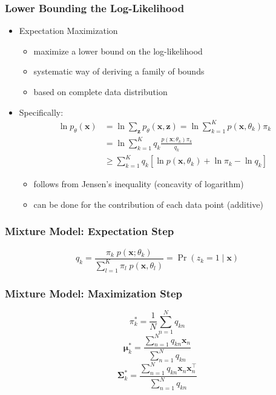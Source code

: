 \documentclass[conference,11pt]{IEEEtran}
\newcommand{\matr}[1]{\boldsymbol{\mathbf{#1}}}
\newcommand{\vect}[1]{\boldsymbol{\mathbf{#1}}}
\newcommand{\trns}[1]{#1^{\top}}
\begin{document}
\subsubsection{Lower Bounding the Log-Likelihood}
\begin{itemize}
  \item Expectation Maximization
    \begin{itemize}
      \item maximize a lower bound on the log-likelihood
      \item systematic way of deriving a family of bounds
      \item based on complete data distribution
    \end{itemize}
  \item Specifically:
    \begin{align*}
      \ln p_{\theta}(\vect{x}) &= \ln \sum_{\vect{z}} p_{\theta}(\vect{x},
      \vect{z}) = \ln \sum_{k=1}^K p(\vect{x}, \theta_k) \pi_k \\
      &= \ln \sum_{k=1}^K q_k \frac{p(\vect{x}; \theta_k) \pi_k}{q_k} \\
      &\geq \sum_{k=1}^K q_k \left[\ln p(\vect{x},\theta_k)+\ln\pi_k-\ln q_k \right]
    \end{align*}
    \begin{itemize}
      \item follows from Jensen's inequality (concavity of logarithm)
      \item can be done for the contribution of each data point (additive)
    \end{itemize}
\end{itemize}

\subsubsection{Mixture Model: Expectation Step}
\[
  q_k = \frac{\pi_k\; p(\vect{x}; \theta_k)}{\sum_{l=1}^K \pi_l\;p(\vect{x}, \theta_l)}
  = \Pr(z_k = 1 \mid \vect{x})
\]

\subsubsection{Mixture Model: Maximization Step}
\[ \pi_k^* = \frac{1}{N} \sum_{n=1}^N q_{kn} \]
\[ \vect{\mu}_k^* = \frac{\sum_{n=1}^N q_{kn}\vect{x}_n}{\sum_{n=1}^N q_{kn}} \]
\[
  \matr{\Sigma}_k^* = \frac{\sum_{n=1}^N
    q_{kn}\vect{x}_n\trns{\vect{x}_n}}{\sum_{n=1}^N q_{kn}}
\]
\end{document}
